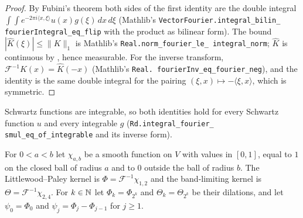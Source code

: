 \begin{proof}
\leanok
By Fubini's theorem both sides of the first identity are the double integral
$\int \int e^{-2\pi i \langle x, \xi \rangle} u(x) g(\xi) \, dx \, d\xi$ (Mathlib's
\texttt{VectorFourier.\allowbreak integral\_\allowbreak bilin\_\allowbreak
fourierIntegral\_\allowbreak eq\_\allowbreak flip} with the product as bilinear form). The
bound $|\widehat K(\xi)| \leq \|K\|_1$ is Mathlib's
\texttt{Real.\allowbreak norm\_\allowbreak fourier\_\allowbreak le\_\allowbreak
integral\_\allowbreak norm}; $\widehat K$ is
continuous by , hence measurable. For the inverse transform,
$\mathcal F^{-1} K(x) = \widehat K(-x)$ (Mathlib's \texttt{Real.\allowbreak
fourierInv\_\allowbreak eq\_\allowbreak fourier\_\allowbreak neg}), and the identity is
the same double integral for the pairing $(\xi, x) \mapsto -\langle \xi, x \rangle$, which is
symmetric.
\end{proof}

Schwartz functions are integrable, so both identities hold for every Schwartz function $u$ and
every integrable $g$ (\texttt{Rd.\allowbreak integral\_\allowbreak fourier\_\allowbreak
smul\_\allowbreak eq\_\allowbreak of\_\allowbreak integrable} and its inverse form).

\begin{definition}
\label{def:lp-kernels}
\leanok
{}
For $0 < a < b$ let $\chi_{a,b}$ be a smooth function on $V$ with values in $[0, 1]$, equal to
$1$ on the closed ball of radius $a$ and to $0$ outside the ball of radius $b$. The
Littlewood--Paley kernel is $\Phi = \mathcal F^{-1} \chi_{1,2}$ and the band-limiting kernel is
$\Theta = \mathcal F^{-1} \chi_{2,4}$. For $k \in \mathbb{N}$ let $\Phi_k = \Phi_{2^k}$ and
$\Theta_k = \Theta_{2^k}$ be their dilations, and let $\psi_0 = \Phi_0$ and
$\psi_j = \Phi_j - \Phi_{j-1}$ for $j \geq 1$.
\end{definition}

